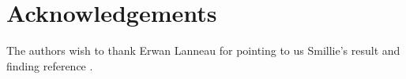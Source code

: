 \documentclass[12pt,a4paper]{amsart}
\newcommand{\reals}{{\mathbb R}}
\newcommand{\A}{{\mathbb A}}
\begin{document}

\section*{Acknowledgements} 
The authors wish to thank Erwan Lanneau for   pointing to us Smillie's result and finding reference \cite{nav}.
\end{document}

